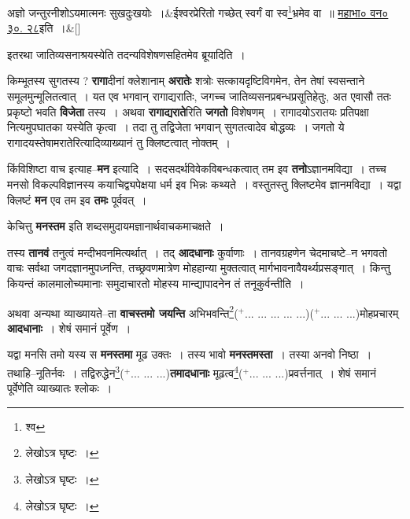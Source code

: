 \documentclass[article,12pt,a4paper]{memoir}
\newcommand{\add}[1]{($^{+}$#1)}
\begin{document}
	  \bigskip
	  \begingroup
	
	    
	    \stanza[\smallbreak]
	अज्ञो जन्तुरनीशोऽयमात्मनः सुखदुःखयोः ।&ईश्वरप्रेरितो गच्छेत् स्वर्गं वा स्व\footnote{श्व}भ्रमेव वा ॥ \href{http://http://sarit.indology.info/?cref=MBh.3.30.28}{महाभा० वन० ३०. २८}इति ।\&[\smallbreak]


	
	  \endgroup
	

	  \pstart इतरथा जातिव्यसनाश्रयस्येति तदन्यविशेषणसहितमेव ब्रूयादिति ।
	\pend
      

	  \pstart किम्भूतस्य सुगतस्य ? \textbf{रागा}दीनां क्लेशानाम् \textbf{अरातेः} शत्रोः सत्कायदृष्टिविगमेन, तेन तेषां स्वसन्ताने समूलमुन्मूलितत्वात् । यत एव भगवान् रागाद्यरातिः, जगच्च जातिव्यसनप्रबन्धप्रसूतिहेतुः, अत एवासौ ततः प्रकृष्टो भवति \textbf{विजेता} तस्य । अथवा \textbf{रागाद्यराते}रिति \textbf{जगतो} विशेषणम् । रागादयोऽरातयः प्रतिपक्षा नित्यमुपघातका यस्येति कृत्वा । तदा तु तद्विजेता भगवान् सुगतत्वादेव बोद्धव्यः । जगतो ये रागादयस्तेषामरातेरित्यादिव्याख्यानं तु क्लिष्टत्वात् नोक्तम् ।
	\pend
      

	  \pstart किंविशिष्टा वाच इत्याह--\textbf{मन} इत्यादि । सदसदर्थविवेकविबन्धकत्वात् तम इव \textbf{तनो}ऽज्ञानमविद्या । तच्च मनसो विकल्पविज्ञानस्य कयाचिद्व्यपेक्षया धर्म इव भिन्नः कथ्यते । वस्तुतस्तु क्लिष्टमेव ज्ञानमविद्या । यद्वा क्लिष्टं \textbf{मन} एव तम इव \textbf{तमः} पूर्ववत् ।
	\pend
      

	  \pstart केचित्तु \textbf{मनस्तम} इति शब्दसमुदायमज्ञानार्थवाचकमाचक्षते ।
	\pend
      

	  \pstart तस्य \textbf{तानवं} तनुत्वं मन्दीभवनमित्यर्थात् । तद् \textbf{आदधानाः} कुर्वाणाः । तानवग्रहणेन चेदमाचष्टे--न भगवतो वाचः सर्वथा जगदज्ञानमुपध्नन्ति, तच्छ्रवणमात्रेण मोहहान्या मुक्तत्वात् मार्गभावनावैयर्थ्यप्रसङ्गात् । किन्तु कियन्तं कालमालोच्यमानाः समुदाचारतो मोहस्य मान्द्यापादनेन तं तनूकुर्वन्तीति ।
	\pend
      

	  \pstart अथवा अन्यथा व्याख्यायते--ता \textbf{वाचस्तमो जयन्ति} अभिभवन्ति\footnote{लेखोऽत्र घृष्टः ।}\add{... ... ... ... ...}\leavevmode{}\add{... ... ...}मोहप्रचारम् \textbf{आदधानाः} । शेषं समानं पूर्वेण ।
	\pend
      

	  \pstart यद्वा मनसि तमो यस्य स \textbf{मनस्तमा} मूढ उक्तः । तस्य भावो \textbf{मनस्तमस्ता} । तस्या अनवो निष्ठा । तथाहि--नूतिर्नवः । तद्विरुद्धेन\footnote{लेखोऽत्र घृष्टः ।}\add{... ... ...}\textbf{तमादधानाः} मूढत्व\footnote{लेखोऽत्र घृष्टः ।}\add{... ... ...}प्रवर्त्तनात् । शेषं समानं पूर्वेणेति व्याख्यातः श्लोकः ।
	\pend
      
\end{document}
